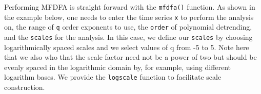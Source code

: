 \documentclass[
  man]{apa6}
\newenvironment{Shaded}{\begin{snugshade}}{\end{snugshade}}
\newcommand{\AttributeTok}[1]{\textcolor[rgb]{0.77,0.63,0.00}{#1}}
\newcommand{\DecValTok}[1]{\textcolor[rgb]{0.00,0.00,0.81}{#1}}
\newcommand{\FloatTok}[1]{\textcolor[rgb]{0.00,0.00,0.81}{#1}}
\newcommand{\FunctionTok}[1]{\textcolor[rgb]{0.00,0.00,0.00}{#1}}
\newcommand{\NormalTok}[1]{#1}
\newcommand{\OtherTok}[1]{\textcolor[rgb]{0.56,0.35,0.01}{#1}}
\newcommand{\SpecialCharTok}[1]{\textcolor[rgb]{0.00,0.00,0.00}{#1}}
\begin{document}
Performing MFDFA is straight forward with the \texttt{mfdfa()} function. As
shown in the example below, one needs to enter the time series \texttt{x} to
perform the analysis on, the range of \texttt{q} order exponents to use, the
\texttt{order} of polynomial detrending, and the \texttt{scales} for the analysis. In
this case, we define our \texttt{scales} by choosing logarithmically spaced
scales and we select values of q from -5 to 5. Note here that we also
who that the scale factor need not be a power of two but should be
evenly spaced in the logarithmic domain by, for example, using different
logarithm bases. We provide the \texttt{logscale} function to facilitate scale
construction.

\begin{Shaded}
\end{Shaded}
\end{document}

